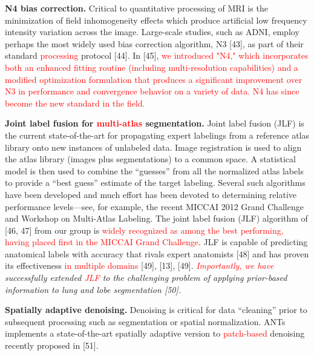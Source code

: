 \documentclass[11pt,]{article}
\begin{document}
\textbf{N4 bias correction.} Critical to quantitative processing of MRI
is the minimization of field inhomogeneity effects which produce
artificial low frequency intensity variation across the image.
Large-scale studies, such as ADNI, employ perhaps the most widely used
bias correction algorithm, N3 {[}43{]}, as part of their standard
\textcolor{red}{processing} protocol {[}44{]}. In {[}45{]},
\textcolor{red}{we introduced "N4," which incorporates both an enhanced fitting
routine (including multi-resolution capabilities) and a modified optimization
formulation that produces a significant improvement over N3 in performance and
convergence behavior on a variety of data.  N4 has since become the new standard in the
field.}

\textbf{Joint label fusion for \textcolor{red}{multi-atlas}
segmentation.} Joint label fusion (JLF) is the current state-of-the-art
for propagating expert labelings from a reference atlas library onto new
instances of unlabeled data. Image registration is used to align the
atlas library (images plus segmentations) to a common space. A
statistical model is then used to combine the ``guesses'' from all the
normalized atlas labels to provide a ``best guess'' estimate of the
target labeling. Several such algorithms have been developed and much
effort has been devoted to determining relative performance
levels---see, for example, the recent MICCAI 2012 Grand Challenge and
Workshop on Multi-Atlas Labeling. The joint label fusion (JLF) algorithm
of {[}46, 47{]} from our group is
\textcolor{red}{widely recognized as among the best performing, having placed
first in the MICCAI Grand Challenge}. JLF is capable of predicting
anatomical labels with accuracy that rivals expert anatomists {[}48{]}
and has proven its effectiveness \textcolor{red}{in multiple domains}
{[}49{]}, {[}13{]}, {[}49{]}.
\emph{\textcolor{red}{Importantly, we have} successfully extended
\textcolor{red}{JLF} to the challenging problem of applying prior-based
information to lung and lobe segmentation {[}50{]}.}

\textbf{Spatially adaptive denoising.} Denoising is critical for data
``cleaning'' prior to subsequent processing such as segmentation or
spatial normalization. ANTs implements a state-of-the-art spatially
adaptive version to \textcolor{red}{patch-based} denoising recently
proposed in {[}51{]}.
\end{document}

